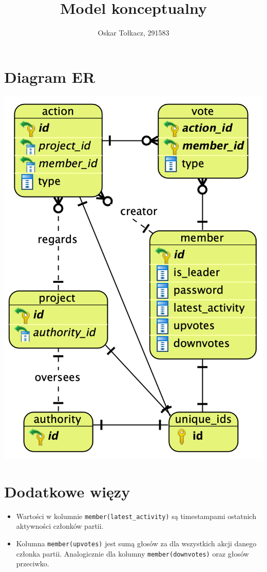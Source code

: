 \documentclass[polish,11pt,a4paper]{article}
\title{\huge{Model konceptualny}}
\author{\large{Oskar Tołkacz, 291583}}
\begin{document}
\clearpage
\maketitle
\thispagestyle{empty}

\newpage
\tableofcontents

\newpage

\section{Diagram ER}
\begin{center}
	\includegraphics[scale=0.3]{ERD.png}
\end{center}

\section{Dodatkowe więzy}
\begin{itemize}
    \item Wartości w kolumnie \texttt{member(latest\_activity)} są timestampami ostatnich aktywności członków partii.
    \item Kolumna \texttt{member(upvotes)} jest sumą głosów za dla wszystkich akcji danego członka partii. Analogicznie dla kolumny \texttt{member(downvotes)} oraz głosów przeciwko.
\end{itemize}
\end{document}
